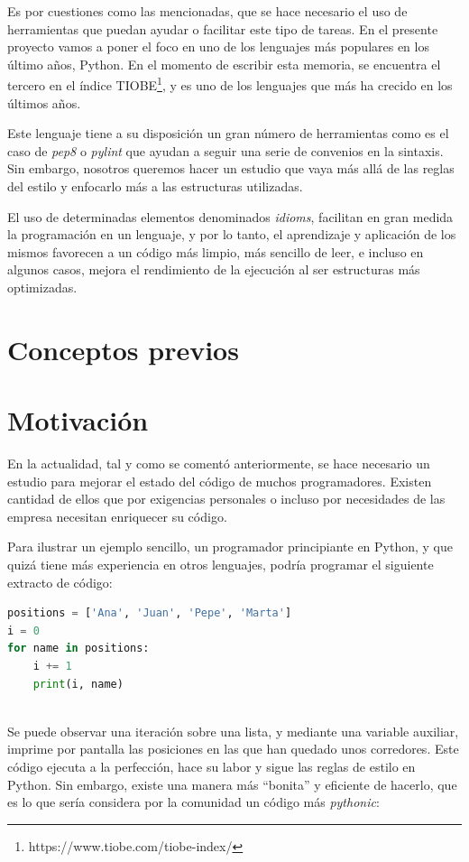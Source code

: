 \documentclass[a4paper, 12pt]{book}
\begin{document}
Es por cuestiones como las mencionadas, que se hace necesario el uso de herramientas que puedan ayudar o facilitar este tipo de tareas. En el presente proyecto vamos a poner el foco en uno de los lenguajes más populares en los último años, Python. En el momento de escribir esta memoria, se encuentra el tercero en el índice TIOBE\footnote{https://www.tiobe.com/tiobe-index/}, y es uno de los lenguajes que más ha crecido en los últimos años.

Este lenguaje tiene a su disposición un gran número de herramientas como es el caso de \textit{pep8} o \textit{pylint} que ayudan a seguir una serie de convenios en la sintaxis. Sin embargo, nosotros queremos hacer un estudio que vaya más allá de las reglas del estilo y enfocarlo más a las estructuras utilizadas.

El uso de determinadas elementos denominados \textit{idioms}, facilitan en gran medida la programación en un lenguaje, y por lo tanto, el aprendizaje y aplicación de los mismos favorecen a un código más limpio, más sencillo de leer, e incluso en algunos casos, mejora el rendimiento de la ejecución al ser estructuras más optimizadas.

\section{Conceptos previos}
\label{sec:ConceptosPrevios}


\section{Motivación}
\label{sec:motivacion}

En la actualidad, tal y como se comentó anteriormente, se hace necesario un estudio para mejorar el estado del código de muchos programadores. Existen cantidad de ellos que por exigencias personales o incluso por necesidades de las empresa necesitan enriquecer su código.

Para ilustrar un ejemplo sencillo, un programador principiante en Python, y que quizá tiene más experiencia en otros lenguajes, podría programar el siguiente extracto de código:

\begin{lstlisting}[language=Python, basicstyle=\small]
positions = ['Ana', 'Juan', 'Pepe', 'Marta']
i = 0
for name in positions:
    i += 1
    print(i, name)
    
\end{lstlisting}
Se puede observar una iteración sobre una lista, y mediante una variable auxiliar, imprime por pantalla las posiciones en las que han quedado unos corredores. Este código ejecuta a la perfección, hace su labor y sigue las reglas de estilo en Python. Sin embargo, existe una manera más ``bonita'' y eficiente de hacerlo, que es lo que sería considera por la comunidad un código más \textit{pythonic}:
\end{document}
